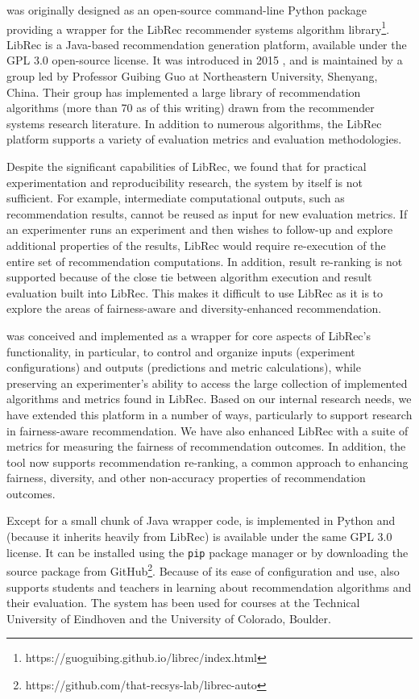 \libauto{} was originally designed as an open-source command-line Python package providing a wrapper for the LibRec recommender systems algorithm library\footnote{https://guoguibing.github.io/librec/index.html}. LibRec is a Java-based recommendation generation platform, available under the GPL 3.0 open-source license. It was introduced in 2015 \cite{guo2015librec}, and is maintained by a group led by Professor Guibing Guo at Northeastern University, Shenyang, China. Their group has implemented a large library of recommendation algorithms (more than 70 as of this writing) drawn from the recommender systems research literature. In addition to numerous algorithms, the LibRec platform supports a variety of evaluation metrics and evaluation methodologies.

Despite the significant capabilities of LibRec, we found that for practical experimentation and reproducibility research, the system by itself is not sufficient. For example, intermediate computational outputs, such as recommendation results, cannot be reused as input for new evaluation metrics. If an experimenter runs an experiment and then wishes to follow-up and explore additional properties of the results, LibRec would require re-execution of the entire set of recommendation computations. In addition, result re-ranking is not supported because of the close tie between algorithm execution and result evaluation built into LibRec. This makes it difficult to use LibRec as it is to explore the areas of fairness-aware and diversity-enhanced recommendation.

\libauto{} was conceived and implemented as a wrapper for core aspects of LibRec's functionality, in particular, to control and organize inputs (experiment configurations) and outputs (predictions and metric calculations), while preserving an experimenter's ability to access the large collection of implemented algorithms and metrics found in LibRec. Based on our internal research needs, we have extended this platform in a number of ways, particularly to support research in fairness-aware recommendation. We have also enhanced LibRec with a suite of metrics for measuring the fairness of recommendation outcomes. In addition, the tool now supports recommendation re-ranking, a common approach to enhancing fairness, diversity, and other non-accuracy properties of recommendation outcomes.

Except for a small chunk of Java wrapper code, \libauto{} is implemented in Python and (because it inherits heavily from LibRec) is available under the same GPL 3.0 license. It can be installed using the \texttt{pip} package manager or by downloading the source package from GitHub\footnote{https://github.com/that-recsys-lab/librec-auto}. Because of its ease of configuration and use, \libauto{} also supports students and teachers in learning about recommendation algorithms and their evaluation. The system has been used for courses at the Technical University of Eindhoven and the University of Colorado, Boulder. 

